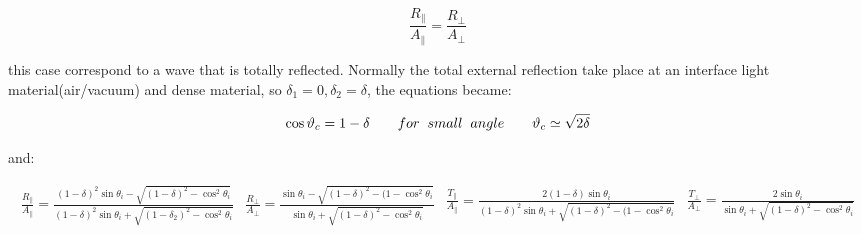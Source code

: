 \begin{equation}
\frac{R_{\parallel}}{A_{\parallel}} = \frac{R_{\perp}}{A_{\perp}}
\label{eq: R/A critical}
\end{equation}
\begin{flushleft}
this case correspond to a wave that is totally reflected. Normally the total external reflection take place at an interface light material(air/vacuum) and dense material, so $\delta_1 = 0, \delta_2 = \delta$, the equations became:
\end{flushleft}
\begin{equation}
\cos \theta_c = 1 - \delta \qquad for \hspace{2mm} small \hspace{2mm} angle \qquad \theta_c \simeq \sqrt{2 \delta}
\end{equation}
\begin{flushleft}
and:
\end{flushleft}
\begin{subequations}
\begin{equation}
\begin{aligned}
\frac{R_{\parallel}}{A_{\parallel}} = \frac{(1 - \delta)^2 \sin \theta_i - \sqrt{(1 - \delta)^2 - \cos^2 \theta_i}}{(1 - \delta)^2 \sin \theta_i + \sqrt{(1 - \delta_2)^2 - \cos^2 \theta_i}} 
\end{aligned}
\label{eq: R/A parll 2}
\end{equation}
\begin{equation}
\begin{aligned}
\frac{R_{\perp}}{A_{\perp}} = \frac{\sin \theta_i - \sqrt{(1 - \delta)^2 - (1 - \cos^2 \theta_i}}{\sin \theta_i  +  \sqrt{(1 - \delta)^2 - \cos^2 \theta_i}} 
\end{aligned}
\label{eq: R/A perp 2}
\end{equation}
\begin{equation}
\begin{aligned}
\frac{T_{\parallel}}{A_{\parallel}} = \frac{2(1 - \delta) \sin \theta_i }{(1 - \delta)^2 \sin \theta_i  +  \sqrt{(1 - \delta)^2 - (1 - \cos^2 \theta_i}} 
\end{aligned}
\label{eq: T/A parll 2}
\end{equation}
\begin{equation}
\begin{aligned}
\frac{T_{\perp}}{A_{\perp}} = \frac{2 \sin \theta_i }{ \sin \theta_i  +  \sqrt{(1 - \delta)^2 - \cos^2 \theta_i}} 
\end{aligned}
\label{eq: T/A perp 2}
\end{equation}
\label{eq: parall and per 3}
\end{subequations}
